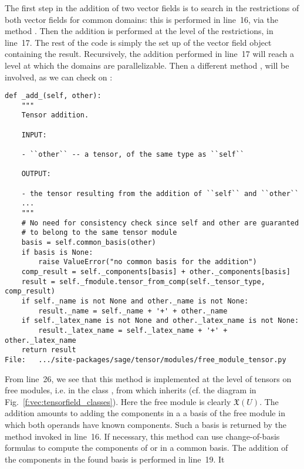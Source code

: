 The first step in the addition of two vector fields is to search in the
restrictions of both vector fields for common domains: this is performed in
line~16, via the method . Then the addition is
performed at the level of the restrictions, in line~17. The rest of the code
is simply the set up of the vector field object containing the result.
Recursively, the addition performed in line~17 will reach a level at which
the domains are parallelizable. Then a different method , will
be involved, as we can check on :
\begin{lstlisting}
def _add_(self, other):
    """
    Tensor addition.

    INPUT:

    - ``other`` -- a tensor, of the same type as ``self``

    OUTPUT:

    - the tensor resulting from the addition of ``self`` and ``other``
    ...
    """
    # No need for consistency check since self and other are guaranted
    # to belong to the same tensor module
    basis = self.common_basis(other)
    if basis is None:
        raise ValueError("no common basis for the addition")
    comp_result = self._components[basis] + other._components[basis]
    result = self._fmodule.tensor_from_comp(self._tensor_type, comp_result)
    if self._name is not None and other._name is not None:
        result._name = self._name + '+' + other._name
    if self._latex_name is not None and other._latex_name is not None:
        result._latex_name = self._latex_name + '+' + other._latex_name
    return result
File:   .../site-packages/sage/tensor/modules/free_module_tensor.py
\end{lstlisting}
From line~26, we see that this method  is implemented
at the level of tensors on free modules, i.e. in the class
, from which  inherits (cf. the diagram in
Fig.~\ref{f:vec:tensorfield_classes}). Here the free module is clearly
$\mathfrak{X}(U)$. The addition amounts to adding the components in a
a basis of the free module in which both operands have known components. Such
a basis is returned by the method  invoked in line~16.
If necessary, this method can use change-of-basis formulas to compute the
components of  or  in a common basis.
The addition of the components in the found basis is performed in line~19. It
